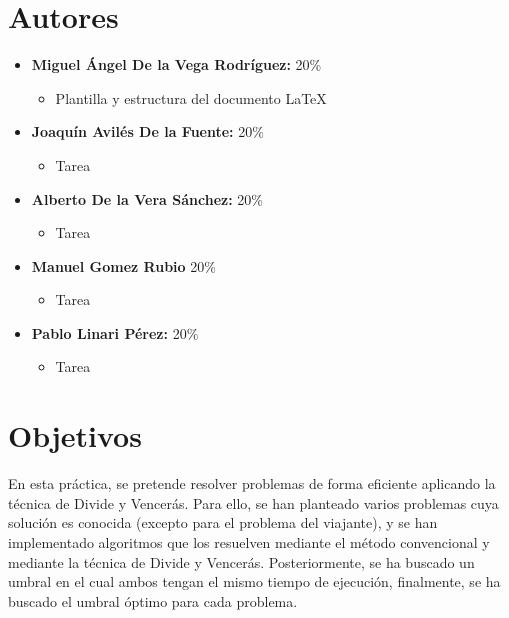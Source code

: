 \documentclass[11pt,openany]{book}
\begin{document}
\tableofcontents %
\newpage %


\chapter{Autores}
\begin{itemize}
    \item \textbf{Miguel Ángel De la Vega Rodríguez:} 20\%
          \begin{itemize}
              \item Plantilla y estructura del documento \LaTeX
          \end{itemize}
    \item \textbf{Joaquín Avilés De la Fuente:} 20\%
          \begin{itemize}
            \item Tarea
          \end{itemize}
    \item \textbf{Alberto De la Vera Sánchez: } 20\%
          \begin{itemize}
            \item Tarea
          \end{itemize}
    \item \textbf{Manuel Gomez Rubio} 20\%
          \begin{itemize}
            \item Tarea
          \end{itemize}
    \item \textbf{Pablo Linari Pérez:} 20\%
          \begin{itemize}
            \item Tarea
          \end{itemize}
\end{itemize}

\chapter{Objetivos}
En esta práctica, se pretende resolver problemas de forma eficiente aplicando la técnica de
Divide y Vencerás. Para ello, se han planteado varios problemas cuya solución es conocida
(excepto para el problema del viajante), y se han implementado algoritmos que los resuelven
mediante el método convencional y mediante la técnica de Divide y Vencerás. Posteriormente, se ha buscado
un umbral en el cual ambos tengan el mismo tiempo de ejecución, finalmente, se ha buscado el 
umbral óptimo para cada problema. 
\end{document}

